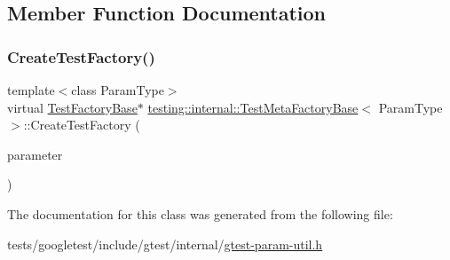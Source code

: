 \subsection{Member Function Documentation}
\mbox{\label{classtesting_1_1internal_1_1TestMetaFactoryBase_a853daab362740bcac55e180128d564ef}} 
\subsubsection{\texorpdfstring{Create\+Test\+Factory()}{CreateTestFactory()}}
{\footnotesize\ttfamily template$<$class Param\+Type$>$ \\
virtual \hyperlink{classtesting_1_1internal_1_1TestFactoryBase}{Test\+Factory\+Base}$\ast$ \hyperlink{classtesting_1_1internal_1_1TestMetaFactoryBase}{testing\+::internal\+::\+Test\+Meta\+Factory\+Base}$<$ Param\+Type $>$\+::Create\+Test\+Factory (\begin{DoxyParamCaption}\item[{Param\+Type}]{parameter }\end{DoxyParamCaption})\hspace{0.3cm}{\ttfamily [pure virtual]}}



The documentation for this class was generated from the following file\+:\begin{DoxyCompactItemize}
\item 
tests/googletest/include/gtest/internal/\hyperlink{gtest-param-util_8h}{gtest-\/param-\/util.\+h}\end{DoxyCompactItemize}
